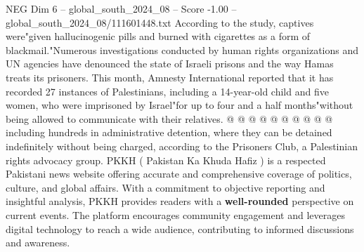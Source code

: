 \begin{textsample}{NEG Dim 6 – global\_south\_2024\_08 – Score -1.00 – global\_south\_2024\_08/111601448.txt}
According to the study, captives were"given hallucinogenic pills and burned with cigarettes as a form of blackmail."Numerous investigations conducted by human rights organizations and UN agencies have denounced the state of Israeli prisons and the way Hamas treats its prisoners.
This month, Amnesty International reported that it has recorded 27 instances of Palestinians, including a 14-year-old child and five women, who were imprisoned by Israel"for up to four and a half months"without being allowed to communicate with their relatives. @ @ @ @ @ @ @ @ @ @ including hundreds in administrative detention, where they can be detained indefinitely without being charged, according to the Prisoners Club, a Palestinian rights advocacy group.
PKKH ( Pakistan Ka Khuda Hafiz ) is a respected Pakistani news website offering accurate and comprehensive coverage of politics, culture, and global affairs.
With a commitment to objective reporting and insightful analysis, PKKH provides readers with a \textbf{well-rounded} perspective on current events.
The platform encourages community engagement and leverages digital technology to reach a wide audience, contributing to informed discussions and awareness.

\end{textsample}
